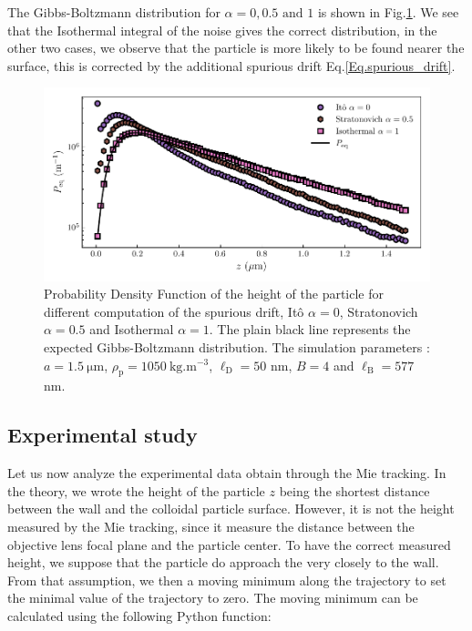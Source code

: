 The Gibbs-Boltzmann distribution for $\alpha = 0 , 0.5 \text{ and } 1 $ is shown in Fig.\ref{fig.pdf_vs_alpha}. We see that the Isothermal integral of the noise gives the correct distribution, in the other two cases, we observe that the particle is more likely to be found nearer the surface, this is corrected by the additional spurious drift Eq.\ref{Eq.spurious_drift}.

\begin{figure}[h!]
	\centering
	\includegraphics{02_body/chapter3/images/simulation_confined_Brownian_motion/Peq_vs_alpha.pdf}
	\caption{Probability Density Function of the height of the particle for different computation of the spurious drift, Itô $\alpha = 0$, Stratonovich $\alpha = 0.5$ and Isothermal $\alpha = 1$. The plain black line represents the expected Gibbs-Boltzmann distribution. The simulation parameters : $a = 1.5 ~ \mathrm{\mu m}$, $\rho_\mathrm{p} = 1050 ~\mathrm{kg.m^{-3}}$, $\ell_\mathrm{D} = 50$ nm, $B = 4$ and $\ell_\mathrm{B} = 577$ nm. }
	\label{fig.pdf_vs_alpha}
\end{figure}


\subsection{Experimental study}
\label{section:expresults}
Let us now analyze the experimental data obtain through the Mie tracking. In the theory, we wrote the height of the particle $z$ being the shortest distance between the wall and the colloidal particle surface. However, it is not the height measured by the Mie tracking, since it measure the distance between the objective lens focal plane and the particle center. To have the correct measured height, we suppose that the particle do approach the very closely to the wall. From that assumption, we then a moving minimum along the trajectory to set the minimal value of the trajectory to zero. The moving minimum can be calculated using the following Python function:



